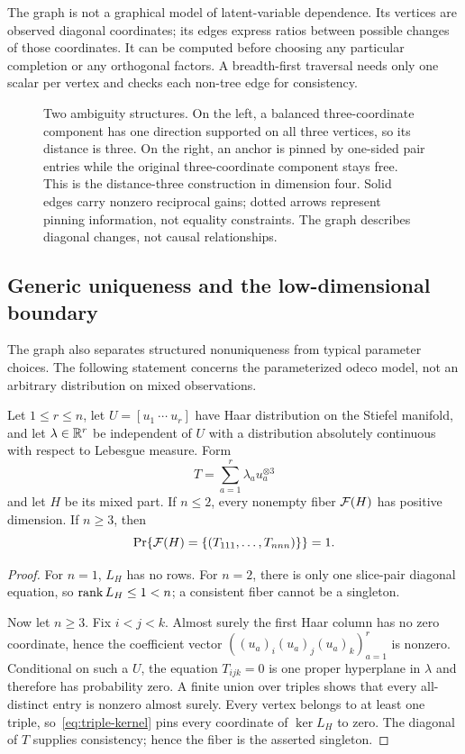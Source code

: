 The graph is not a graphical model of latent-variable dependence. Its vertices are observed diagonal coordinates; its edges express ratios between possible changes of those coordinates. It can be computed before choosing any particular completion or any orthogonal factors. A breadth-first traversal needs only one scalar per vertex and checks each non-tree edge for consistency.

\begin{figure}[t]
\centering

\caption{Two ambiguity structures. On the left, a balanced three-coordinate component has one direction supported on all three vertices, so its distance is three. On the right, an anchor is pinned by one-sided pair entries while the original three-coordinate component stays free. This is the distance-three construction in dimension four. Solid edges carry nonzero reciprocal gains; dotted arrows represent pinning information, not equality constraints. The graph describes diagonal changes, not causal relationships.}\label{fig:components}
\end{figure}


\subsection{Generic uniqueness and the low-dimensional boundary}
The graph also separates structured nonuniqueness from typical parameter choices.  The following statement concerns the parameterized odeco model, not an arbitrary distribution on mixed observations.

\begin{theorem}\label{thm:generic-rigidity}
Let $1\le r\le n$, let $U=[u_1\ \cdots\ u_r]$ have Haar distribution on the Stiefel manifold, and let $\lambda\in\mathbb R^r$ be independent of $U$ with a distribution absolutely continuous with respect to Lebesgue measure.  Form
\[
 T=\sum_{a=1}^r\lambda_a u_a^{\otimes3}
\]
and let $H$ be its mixed part.  If $n\le2$, every nonempty fiber $\mathcal F(H)$ has positive dimension.  If $n\ge3$, then
\[
 \Pr\{\mathcal F(H)=\{(T_{111},\ldots,T_{nnn})\}\}=1.
\]
\end{theorem}
\begin{proof}
For $n=1$, $L_H$ has no rows.  For $n=2$, there is only one slice-pair diagonal equation, so $\operatorname{rank} L_H\le1<n$; a consistent fiber cannot be a singleton.

Now let $n\ge3$.  Fix $i<j<k$.  Almost surely the first Haar column has no zero coordinate, hence the coefficient vector
$((u_a)_i(u_a)_j(u_a)_k)_{a=1}^r$ is nonzero.  Conditional on such a $U$, the equation
$T_{ijk}=0$ is one proper hyperplane in $\lambda$ and therefore has probability zero.  A finite union over triples shows that every all-distinct entry is nonzero almost surely.  Every vertex belongs to at least one triple, so~\eqref{eq:triple-kernel} pins every coordinate of $\ker L_H$ to zero.  The diagonal of $T$ supplies consistency; hence the fiber is the asserted singleton.
\end{proof}

